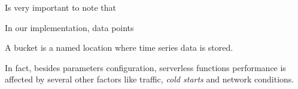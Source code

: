 \documentclass[12pt,a4paper]{report}
\begin{document}
Is very important to note that  

In our implementation, data points 

A bucket is a named location where time series data is stored.


 In fact, besides parameters configuration, serverless functions performance is affected by several other factors like traffic, \textit{cold starts} and network conditions. 





\end{document}
